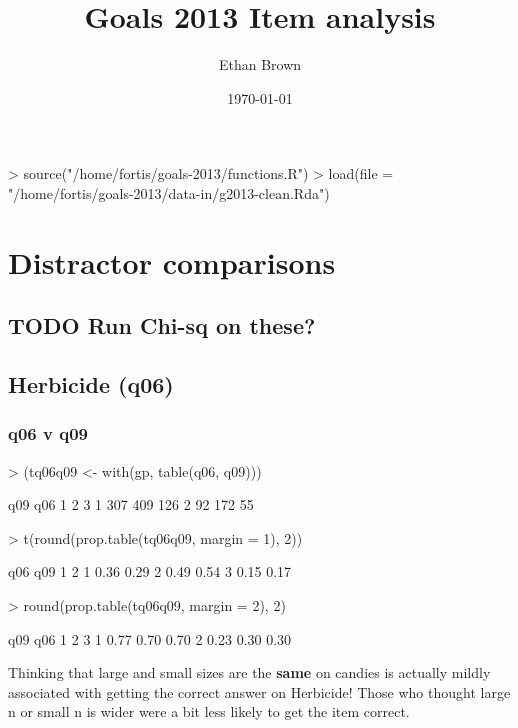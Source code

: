 \documentclass[11pt]{article}
\author{Ethan Brown}
\date{\today}
\title{Goals 2013 Item analysis}
\begin{document}
\maketitle
\begin{Schunk}
\begin{Sinput}
> source("/home/fortis/goals-2013/functions.R")
> load(file = "/home/fortis/goals-2013/data-in/g2013-clean.Rda")
\end{Sinput}
\end{Schunk}

\section{Distractor comparisons}
\label{sec-1}

\subsection{{\bfseries\sffamily TODO} Run Chi-sq on these?}
\label{sec-1-1}
\subsection{Herbicide (q06)}
\label{sec-1-2}
\subsubsection{q06 v q09}
\label{sec-1-2-1}
\begin{Schunk}
\begin{Sinput}
> (tq06q09 <- with(gp, table(q06, q09)))
\end{Sinput}
\begin{Soutput}
   q09
q06   1   2   3
  1 307 409 126
  2  92 172  55
\end{Soutput}
\begin{Sinput}
> t(round(prop.table(tq06q09, margin = 1), 2))
\end{Sinput}
\begin{Soutput}
   q06
q09    1    2
  1 0.36 0.29
  2 0.49 0.54
  3 0.15 0.17
\end{Soutput}
\begin{Sinput}
> round(prop.table(tq06q09, margin = 2), 2)
\end{Sinput}
\begin{Soutput}
   q09
q06    1    2    3
  1 0.77 0.70 0.70
  2 0.23 0.30 0.30
\end{Soutput}
\end{Schunk}

Thinking that large and small sizes are the \textbf{same} on candies is actually mildly associated with getting the correct answer on Herbicide!  Those who thought large n or small n is wider were a bit less likely to get the item correct.
\end{document}
